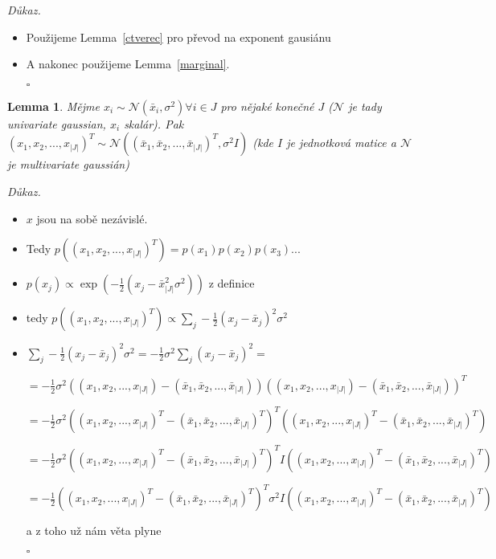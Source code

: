 \documentclass{article}
\newenvironment{pitemize}{
\begin{itemize}
  \setlength{\itemsep}{5pt}
  \setlength{\parskip}{0pt}
  \setlength{\parsep}{0pt}
}{\end{itemize}}
\newenvironment{pproof}{
\noindent\emph{Důkaz.}
\begin{pitemize}
}{\hfill$\square$\end{pitemize}}
\newcommand{\NN}{\mathcal{N}}
\newtheorem{lemma}{Lemma}
\theoremstyle{definition}
\begin{document}
\begin{pproof}
\item Použijeme Lemma~\ref{ctverec} pro převod na exponent gausiánu
\item A nakonec použijeme Lemma~\ref{marginal}.


\end{pproof}

\begin{lemma}
\label{unimulti}
Mějme $x_i\sim\NN(\bar{x}_i,\sigma^2) \forall i \in J$ pro nějaké konečné $J$ ($\NN$ je tady univariate gaussian, $x_i$ skalár). Pak $\left(x_1,x_2,...,x_{\left|J\right|}\right)^T\sim \NN\left(\left(\bar{x}_1,\bar{x}_2,...,\bar{x}_{\left|J\right|} \right)^T,\sigma^2I\right)$
 (kde $I$ je jednotková matice a $\NN$ je multivariate gaussián)
\end{lemma}

\begin{pproof}
\item $x$ jsou na sobě nezávislé.

\item Tedy $p\left(\left(x_1,x_2,...,x_{\left|J\right|}\right)^T\right)=p(x_1) p(x_2)p(x_3)...$
\item $p(x_j)\propto \exp\left(-\frac{1}{2}\left(x_j-\bar{x}_{\left|J\right|}^2
\sigma^2\right)\right)$ z definice
\item tedy $p\left(\left(x_1,x_2,...,x_{\left|J\right|}\right)^T\right)
\propto
\sum_j -\frac{1}{2}(x_j-\bar{x}_j)^2\sigma^2$
\item $\sum_j -\frac{1}{2}(x_j-\bar{x}_j)^2\sigma^2=-\frac{1}{2}\sigma^2\sum_j (x_j-\bar{x}_j)^2=$

$= -\frac{1}{2}\sigma^2\left(\left(x_1,x_2,...,x_{\left|J\right|}\right) -\left(\bar{x}_1,\bar{x}_2,...,\bar{x}_{\left|J\right|} \right) \right) \left(\left(x_1,x_2,...,x_{\left|J\right|}\right) -\left(\bar{x}_1,\bar{x}_2,...,\bar{x}_{\left|J\right|} \right) \right)^T$

$= -\frac{1}{2}\sigma^2\left(\left(x_1,x_2,...,x_{\left|J\right|}\right)^T -\left(\bar{x}_1,\bar{x}_2,...,\bar{x}_{\left|J\right|} \right)^T \right)^T \left(\left(x_1,x_2,...,x_{\left|J\right|}\right)^T -\left(\bar{x}_1,\bar{x}_2,...,\bar{x}_{\left|J\right|} \right)^T \right)$

$= -\frac{1}{2}\sigma^2\left(\left(x_1,x_2,...,x_{\left|J\right|}\right)^T -\left(\bar{x}_1,\bar{x}_2,...,\bar{x}_{\left|J\right|} \right)^T \right)^T I\left(\left(x_1,x_2,...,x_{\left|J\right|}\right)^T -\left(\bar{x}_1,\bar{x}_2,...,\bar{x}_{\left|J\right|} \right)^T \right)$

$= -\frac{1}{2}\left(\left(x_1,x_2,...,x_{\left|J\right|}\right)^T -\left(\bar{x}_1,\bar{x}_2,...,\bar{x}_{\left|J\right|} \right)^T \right)^T \sigma^2I\left(\left(x_1,x_2,...,x_{\left|J\right|}\right)^T -\left(\bar{x}_1,\bar{x}_2,...,\bar{x}_{\left|J\right|} \right)^T \right)$

a z toho už nám věta plyne

\end{pproof}
\end{document}
